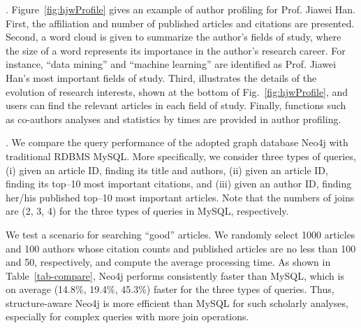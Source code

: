 





.
Figure~\ref{fig:hjwProfile} gives an example of author profiling for Prof. Jiawei Han.
First, the affiliation and number of published articles and citations are presented.
Second, a word cloud is given to summarize the author's fields of study, where the size of a word represents its importance in the author's research career. For instance, ``data mining'' and ``machine learning'' are identified as Prof. Jiawei Han's most important fields of study.
Third, \oursystem illustrates the details of the evolution of research interests, shown at the bottom of Fig.~\ref{fig:hjwProfile}, and users can find the relevant articles in each field of study.
Finally, functions such as co-authors analyses and statistics by times are provided in author profiling.





.
We compare the query performance of the adopted graph database Neo4j with traditional RDBMS MySQL. More specifically, we consider three types of queries, \ie (i) given an article ID, finding its title and authors, (ii)  given an article ID, finding its top--10 most important citations, and (iii) given an author ID, finding her/his published top--10 most important articles. Note that the numbers of joins are (2, 3, 4) for the three types of queries in MySQL, respectively.

We test a scenario for searching ``good'' articles. We randomly select 1000 articles and 100 authors whose citation counts and published articles are no less than 100 and 50, respectively, and compute the average processing time. As shown in Table~\ref{tab-compare}, Neo4j performs consistently faster than MySQL, which is on average (14.8\%, 19.4\%, 45.3\%) faster for the three types of queries.
Thus, structure-aware Neo4j is more efficient than MySQL for such scholarly analyses, especially for complex queries with more join operations.


